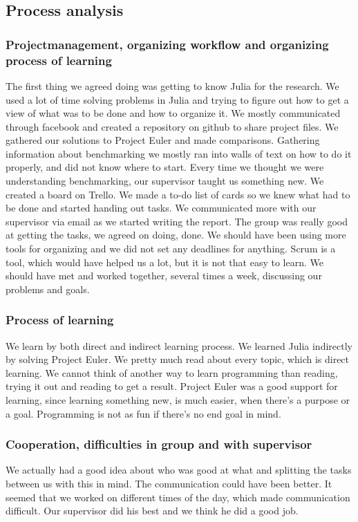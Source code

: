 \documentclass[a4paper, 11pt, titlepage]{article}
\begin{document}
\subsection{Process analysis}
\subsubsection{Projectmanagement, organizing workflow and organizing process of learning}
The first thing we agreed doing was getting to know Julia for the research. We used a lot of time solving problems in Julia and trying to figure out how to get a view of what was to be done and how to organize it. We mostly communicated through facebook and created a repository on github to share project files. We gathered our solutions to Project Euler and made comparisons. Gathering information about benchmarking we mostly ran into walls of text on how to do it properly, and did not know where to start. Every time we thought we were understanding benchmarking, our supervisor taught us something new. We created a board on Trello. We made a to-do list of cards so we knew what had to be done and started handing out tasks. We communicated more with our supervisor via email as we started writing the report. The group was really good at getting the tasks, we agreed on doing, done. We should have been using more tools for organizing and we did not set any deadlines for anything. Scrum is a tool, which would have helped us a lot, but it is not that easy to learn. We should have met and worked together, several times a week, discussing our problems and goals. 

\subsubsection{Process of learning}
We learn by both direct and indirect learning process. We learned Julia indirectly by solving Project Euler. We pretty much read about every topic, which is direct learning. We cannot think of another way to learn programming than reading, trying it out and reading to get a result. Project Euler was a good support for learning, since learning something new, is much easier, when there's a purpose or a goal. Programming is not as fun if there's no end goal in mind.

\subsubsection{Cooperation, difficulties in group and with supervisor}
We actually had a good idea about who was good at what and splitting the tasks between us with this in mind. The communication could have been better. It seemed that we worked on different times of the day, which made communication difficult. Our supervisor did his best and we think he did a good job.
\end{document}
